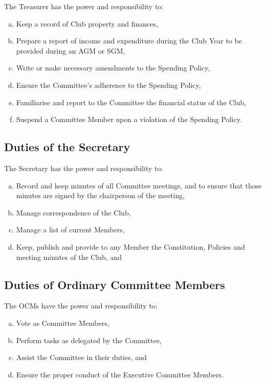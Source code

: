 \documentclass[a4paper,12pt]{article}
\begin{document}
The Treasurer has the power and responsibility to:

\begin{enumerate}[a)]
	\item Keep a record of Club property and finances,
	\item Prepare a report of income and expenditure during the Club Year to be provided during an AGM or SGM,
	\item Write or make necessary amendments to the Spending Policy,
	\item Ensure the Committee's adherence to the Spending Policy,
	\item Familiarise and report to the Committee the financial status of the Club,
	\item Suspend a Committee Member upon a violation of the Spending Policy.
\end{enumerate}

\subsection{Duties of the Secretary}

The Secretary has the power and responsibility to:

\begin{enumerate}[a)]
	\item Record and keep minutes of all Committee meetings, and to ensure that those minutes are signed by the chairperson of the meeting,
	\item Manage correspondence of the Club,
	\item Manage a list of current Members,
	\item Keep, publish and provide to any Member the Constitution, Policies and meeting minutes of the Club, and
\end{enumerate}

\subsection{Duties of Ordinary Committee Members}

The OCMs have the power and responsibility to:

\begin{enumerate}[a)]
	\item Vote as Committee Members,
	\item Perform tasks as delegated by the Committee,
	\item Assist the Committee in their duties, and
	\item Ensure the proper conduct of the Executive Committee Members.
\end{enumerate}
\end{document}
